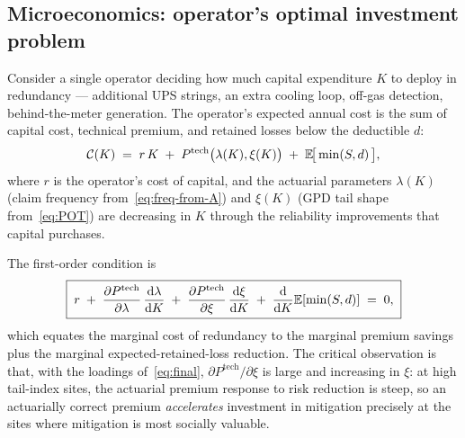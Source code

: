\subsection{Microeconomics: operator's optimal investment problem}\label{ss:micro}

Consider a single operator deciding how much capital expenditure $K$
to deploy in redundancy --- additional UPS strings, an extra cooling
loop, off-gas detection, behind-the-meter generation. The operator's
expected annual cost is the sum of capital cost, technical premium,
and retained losses below the deductible $d$:
\begin{equation}\label{eq:opercost}
   \mathcal{C}(K) \;=\; r\,K \;+\; P^{\mathrm{tech}}\bigl(\lambda(K),\xi(K)\bigr)
   \;+\; \mathbb{E}\!\bigl[\,\min(S,d)\,\bigr],
\end{equation}
where $r$ is the operator's cost of capital, and the actuarial
parameters $\lambda(K)$ (claim frequency from~\eqref{eq:freq-from-A})
and $\xi(K)$ (GPD tail shape from~\eqref{eq:POT}) are decreasing in
$K$ through the reliability improvements that capital purchases.

The first-order condition is
\begin{equation}\label{eq:foc}
   \boxed{\;
   r \;+\; \frac{\partial P^{\mathrm{tech}}}{\partial\lambda}\,
   \frac{\mathrm{d}\lambda}{\mathrm{d} K}
   \;+\; \frac{\partial P^{\mathrm{tech}}}{\partial\xi}\,
   \frac{\mathrm{d}\xi}{\mathrm{d} K}
   \;+\; \frac{\mathrm{d}}{\mathrm{d} K}\mathbb{E}[\min(S,d)] \;=\; 0,\;}
\end{equation}
which equates the marginal cost of redundancy to the marginal premium
savings plus the marginal expected-retained-loss reduction. The
critical observation is that, with the loadings of~\eqref{eq:final},
$\partial P^{\mathrm{tech}}/\partial\xi$ is large and increasing in
$\xi$: at high tail-index sites, the actuarial premium response to
risk reduction is steep, so an actuarially correct premium
\emph{accelerates} investment in mitigation precisely at the sites
where mitigation is most socially valuable.

